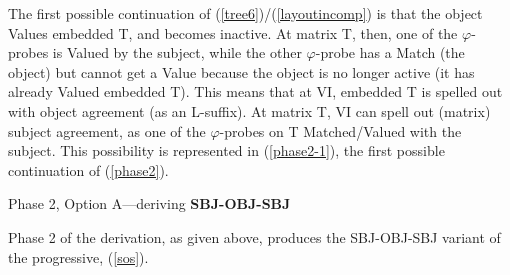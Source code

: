 \documentclass[output=paper
,modfonts
,nonflat]{langsci/langscibook}
\begin{document}
The first possible continuation of (\ref{tree6})/(\ref{layoutincomp}) is that the object Values embedded T, and becomes inactive. At matrix T, then, one of the $\varphi$-probes is Valued by the subject, while the other $\varphi$-probe has a Match (the object) but cannot get a Value because the object is no longer active (it has already Valued embedded T). This means that at VI, embedded T is spelled out with object agreement (as an L-suffix). At matrix T, VI can spell out (matrix) subject agreement, as one of the $\varphi$-probes on T Matched/Valued with the subject. This possibility is represented in (\ref{phase2-1}), the first possible continuation of (\ref{phase2}).

\begin{exe}
\ex Phase 2, Option A---deriving \textbf{SBJ-OBJ-SBJ} \label{phase2-1}
\begin{xlist}
\label{phase2-1b}
\end{xlist}
\end{exe}

\noindent Phase 2 of the derivation, as given above, produces the SBJ-OBJ-SBJ variant of the progressive, (\ref{sos}).
\end{document}
